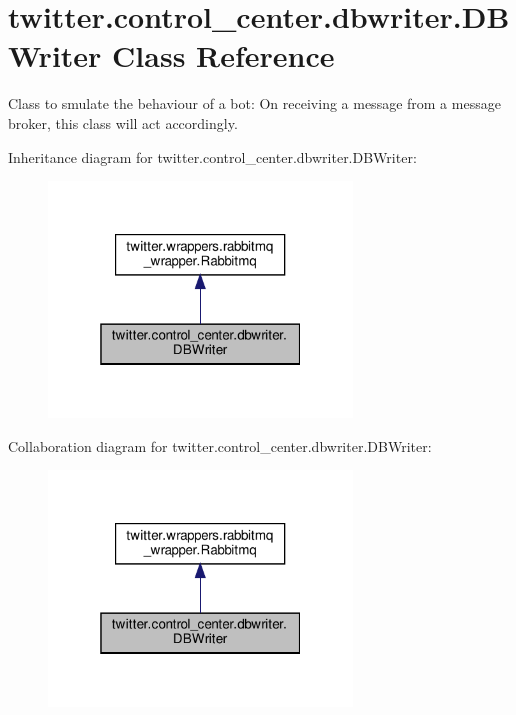 \hypertarget{classtwitter_1_1control__center_1_1dbwriter_1_1DBWriter}{}\section{twitter.\+control\+\_\+center.\+dbwriter.\+D\+B\+Writer Class Reference}
\label{classtwitter_1_1control__center_1_1dbwriter_1_1DBWriter}


Class to smulate the behaviour of a bot\+: On receiving a message from a message broker, this class will act accordingly.  




Inheritance diagram for twitter.\+control\+\_\+center.\+dbwriter.\+D\+B\+Writer\+:
\nopagebreak
\begin{figure}[H]
\begin{center}
\leavevmode
\includegraphics[width=229pt]{d3/d96/classtwitter_1_1control__center_1_1dbwriter_1_1DBWriter__inherit__graph}
\end{center}
\end{figure}


Collaboration diagram for twitter.\+control\+\_\+center.\+dbwriter.\+D\+B\+Writer\+:
\nopagebreak
\begin{figure}[H]
\begin{center}
\leavevmode
\includegraphics[width=229pt]{d7/d51/classtwitter_1_1control__center_1_1dbwriter_1_1DBWriter__coll__graph}
\end{center}
\end{figure}
